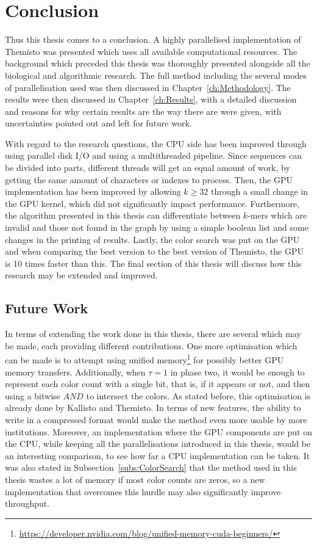 \chapter{Conclusion}\label{ch:Conclusion}

Thus this thesis comes to a conclusion.
A highly parallelised implementation of Themisto was presented which uses all available computational resources.
The background which preceded this thesis was thoroughly presented alongside all the biological and algorithmic research.
The full method including the several modes of parallelisation used was then discussed in Chapter~\ref{ch:Methodology}.
The results were then discussed in Chapter~\ref{ch:Results}, with a detailed discussion and reasons for why certain results are the way there are were given, with uncertainties pointed out and left for future work.

With regard to the research questions, the CPU side has been improved through using parallel disk I/O and using a multithreaded pipeline.
Since sequences can be divided into parts, different threads will get an equal amount of work, by getting the same amount of characters or indexes to process.
Then, the GPU implementation has been improved by allowing $k \ge 32$ through a small change in the GPU kernel, which did not significantly impact performance.
Furthermore, the algorithm presented in this thesis can differentiate between $k$-mers which are invalid and those not found in the graph by using a simple boolean list and some changes in the printing of results.
Lastly, the color search was put on the GPU and when comparing the best version to the best version of Themisto, the GPU is 10 times faster than this.
The final section of this thesis will discuss how this research may be extended and improved.

\section{Future Work}

In terms of extending the work done in this thesis, there are several which may be made, each providing different contributions.
One more optimisation which can be made is to attempt using unified memory\footnote{\url{https://developer.nvidia.com/blog/unified-memory-cuda-beginners/}} for possibly better GPU memory transfers.
Additionally, when $\tau=1$ in phase two, it would be enough to represent each color count with a single bit, that is, if it appears or not, and then using a bitwise $AND$ to intersect the colors.
As stated before, this optimisation is already done by Kallisto and Themisto.
In terms of new features, the ability to write in a compressed format would make the method even more usable by more institutions.
Moreover, an implementation where the GPU components are put on the CPU, while keeping all the parallelisations introduced in this thesis, would be an interesting comparison, to see how far a CPU implementation can be taken.
It was also stated in Subsection~\ref{subs:ColorSearch} that the method used in this thesis wastes a lot of memory if most color counts are zeros, so a new implementation that overcomes this hurdle may also significantly improve throughput.


